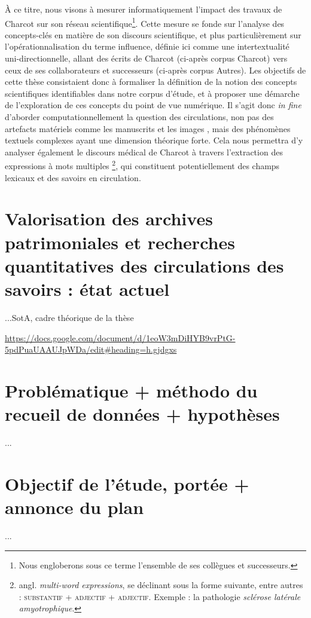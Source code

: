 À ce titre, nous visons à mesurer informatiquement l'impact des travaux de Charcot sur son réseau scientifique\footnote{Nous engloberons sous ce terme l'ensemble de ses collègues et successeurs.}. Cette mesure se fonde sur l'analyse des concepts-clés en matière de son discours scientifique, et plus particulièrement sur l'opérationnalisation du terme \og{}influence\fg{}, définie ici comme une intertextualité uni-directionnelle, allant des écrits de Charcot (ci-après corpus \og{}Charcot\fg{}) vers ceux de ses collaborateurs et successeurs (ci-après corpus \og{}Autres\fg{}). Les objectifs de cette thèse consistaient donc à formaliser la définition de la notion des concepts scientifiques identifiables dans notre corpus d'étude, et à proposer une démarche de l'exploration de ces concepts du point de vue numérique. Il s'agit donc \textit{in fine} d'aborder computationnellement la question des circulations, non pas des artefacts matériels comme les manuscrits \citep{gabay2021katabase} et les images \citep{joyeux2019visual}, mais des phénomènes textuels complexes \citep{manjavacas} ayant une dimension théorique forte. Cela nous permettra d'y analyser également le discours médical de Charcot à travers l'extraction des expressions à mots multiples \citep[p. 96]{nerima2006}\footnote{angl. \textit{multi-word expressions}, se déclinant sous la forme suivante, entre autres : \textsc{substantif + adjectif + adjectif}. Exemple : la pathologie \textit{sclérose latérale amyotrophique}.}, qui constituent potentiellement des champs lexicaux et des savoirs en circulation.






\section{Valorisation des archives patrimoniales et recherches quantitatives des circulations des savoirs : état actuel}
...SotA, cadre théorique de la thèse

\url{https://docs.google.com/document/d/1eoW3mDiHYB9vrPtG-5pdPuaUAAUJpWDa/edit\#heading=h.gjdgxs}
\section{Problématique + méthodo du recueil de données + hypothèses}
...
\section{Objectif de l'étude, portée + annonce du plan}
...

